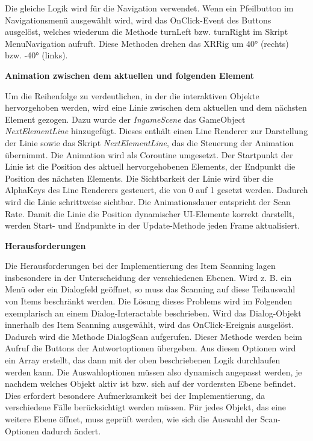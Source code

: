 Die gleiche Logik wird für die Navigation verwendet. Wenn ein Pfeilbutton im Navigationsmenü ausgewählt wird, wird das OnClick-Event des Buttons ausgelöst, welches wiederum die Methode turnLeft bzw. turnRight im Skript MenuNavigation aufruft. Diese Methoden drehen das XRRig um 40° (rechts) bzw. -40° (links).

\textbf{Animation zwischen dem aktuellen und folgenden Element}

Um die Reihenfolge zu verdeutlichen, in der die interaktiven Objekte hervorgehoben werden, wird eine Linie zwischen dem aktuellen und dem nächsten Element gezogen. Dazu wurde der \textit{IngameScene} das GameObject \textit{NextElementLine} hinzugefügt. Dieses enthält einen Line Renderer zur Darstellung der Linie sowie das Skript \textit{NextElementLine}, das die Steuerung der Animation übernimmt.
Die Animation wird als Coroutine umgesetzt. Der Startpunkt der Linie ist die Position des aktuell hervorgehobenen Elements, der Endpunkt die Position des nächsten Elements. Die Sichtbarkeit der Linie wird über die AlphaKeys des Line Renderers gesteuert, die von 0 auf 1 gesetzt werden. Dadurch wird die Linie schrittweise sichtbar. Die Animationsdauer entspricht der Scan Rate. Damit die Linie die Position dynamischer UI-Elemente korrekt darstellt, werden Start- und Endpunkte in der Update-Methode jeden Frame aktualisiert.

\textbf{Herausforderungen}

Die Herausforderungen bei der Implementierung des Item Scanning lagen insbesondere in der Unterscheidung der verschiedenen Ebenen. Wird z. B.  ein Menü oder ein Dialogfeld geöffnet, so muss das Scanning auf diese Teilauswahl von Items beschränkt werden. Die Lösung dieses Problems wird im Folgenden exemplarisch an einem Dialog-Interactable beschrieben. 
Wird das Dialog-Objekt innerhalb des Item Scanning ausgewählt, wird das OnClick-Ereignis ausgelöst. Dadurch wird die Methode DialogScan aufgerufen. Dieser Methode werden beim Aufruf die Buttons der Antwortoptionen übergeben. Aus diesen Optionen wird ein Array erstellt, das dann mit der oben beschriebenen Logik durchlaufen werden kann. Die Auswahloptionen müssen also dynamisch angepasst werden, je nachdem welches Objekt aktiv ist bzw. sich auf der vordersten Ebene befindet. Dies erfordert besondere Aufmerksamkeit bei der Implementierung, da verschiedene Fälle berücksichtigt werden müssen. Für jedes Objekt, das eine weitere Ebene öffnet, muss geprüft werden, wie sich die Auswahl der Scan-Optionen dadurch ändert. 

